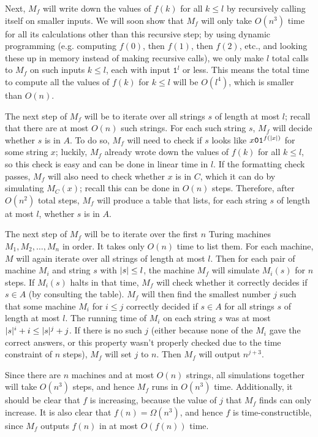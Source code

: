 Next, $M_f$ will write down the values of $f(k)$ for all $k \leq l$ by recursively calling itself on smaller inputs. We will soon show that $M_f$ will only take $O(n^3)$ time for all its calculations other than this recursive step; by using dynamic programming (e.g. computing $f(0)$, then $f(1)$, then $f(2)$, etc., and looking these up in memory instead of making recursive calls), we only make $l$ total calls to $M_f$ on such inputs $k \leq l$, each with input $\texttt{1}^l$ or less. This means the total time to compute all the values of $f(k)$ for $k \leq l$ will be $O(l^4)$, which is smaller than $O(n)$.

The next step of $M_f$ will be to iterate over all strings $s$ of length at most $l$; recall that there are at most $O(n)$ such strings. For each such string $s$, $M_f$ will decide whether $s$ is in $A$. To do so, $M_f$ will need to check if $s$ looks like $x\texttt{0}\texttt{1}^{f(| x |)}$ for some string $x$; luckily, $M_f$ already wrote down the values of $f(k)$ for all $k \leq l$, so this check is easy and can be done in linear time in $l$. If the formatting check passes, $M_f$ will also need to check whether $x$ is in $C$, which it can do by simulating $M_C(x)$; recall this can be done in $O(n)$ steps. Therefore, after $O(n^2)$ total steps, $M_f$ will produce a table that lists, for each string $s$ of length at most $l$, whether $s$ is in $A$.

The next step of $M_f$ will be to iterate over the first $n$ Turing machines $M_1, M_2, \dots, M_n$ in order. It takes only $O(n)$ time to list them. For each machine, $M$ will again iterate over all strings of length at most $l$. Then for each pair of machine $M_i$ and string $s$ with $| s | \leq l$, the machine $M_f$ will simulate $M_i(s)$ for $n$ steps. If $M_i(s)$ halts in that time, $M_f$ will check whether it correctly decides if $s \in A$ (by consulting the table). $M_f$ will then find the smallest number $j$ such that some machine $M_i$ for $i \leq j$ correctly decided if $s \in A$ for all strings $s$ of length at most $l$. The running time of $M_i$ on each string $s$ was at most $| s |^i + i \leq | s |^j + j$. If there is no such $j$ (either because none of the $M_i$ gave the correct answers, or this property wasn't properly checked due to the time constraint of $n$ steps), $M_f$ will set $j$ to $n$. Then $M_f$ will output $n^{j + 3}$.

Since there are $n$ machines and at most $O(n)$ strings, all simulations together will take $O(n^3)$ steps, and hence $M_f$ runs in $O(n^3)$ time. Additionally, it should be clear that $f$ is increasing, because the value of $j$ that $M_f$ finds can only increase. It is also clear that $f(n) = \Omega(n^3)$, and hence $f$ is time-constructible, since $M_f$ outputs $f(n)$ in at most $O(f(n))$ time.

